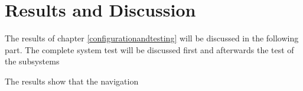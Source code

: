 \chapter{Results and Discussion}
\label{resultanddiscussion}

The results of chapter \ref{configurationandtesting} will be discussed in the following part. The complete system test will be discussed first and afterwards the test of the subsystems

The results show that the navigation

